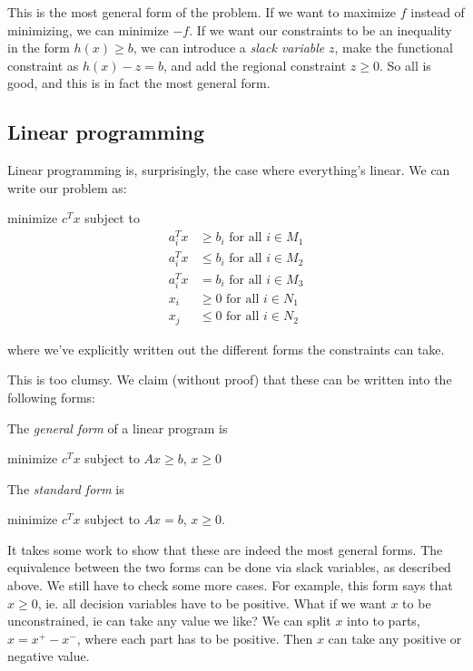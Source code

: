 \documentclass[a4paper]{article}
\begin{document}
This is the most general form of the problem. If we want to maximize $f$ instead of minimizing, we can minimize $-f$. If we want our constraints to be an inequality in the form $h(x) \geq b$, we can introduce a \emph{slack variable} $z$, make the functional constraint as $h(x) - z = b$, and add the regional constraint $z \geq 0$. So all is good, and this is in fact the most general form.

\subsection{Linear programming}
Linear programming is, surprisingly, the case where everything's linear. We can write our problem as:

\begin{center}
  minimize $c^Tx$ subject to
  \begin{align*}
    a_i^Tx &\geq b_i \text{ for all }i \in M_1\\
    a_i^Tx &\leq b_i \text{ for all }i \in M_2\\
    a_i^Tx &= b_i \text{ for all }i \in M_3\\
    x_i &\geq 0 \text{ for all }i \in N_1\\
    x_j &\leq 0 \text{ for all }i \in N_2
  \end{align*}
\end{center}
where we've explicitly written out the different forms the constraints can take.

This is too clumsy. We claim (without proof) that these can be written into the following forms:

\begin{defi}
  The \emph{general form} of a linear program is
  \begin{center}
    minimize $c^T x$ subject to $Ax \geq b$, $x \geq 0$
  \end{center}
  The \emph{standard form} is
  \begin{center}
    minimize $c^T x$ subject to $Ax = b$, $x \geq 0$.
  \end{center}
\end{defi}
It takes some work to show that these are indeed the most general forms. The equivalence between the two forms can be done via slack variables, as described above. We still have to check some more cases. For example, this form says that $x \geq 0$, ie. all decision variables have to be positive. What if we want $x$ to be unconstrained, ie can take any value we like? We can split $x$ into to parts, $x = x^+ - x^-$, where each part has to be positive. Then $x$ can take any positive or negative value.
\end{document}
